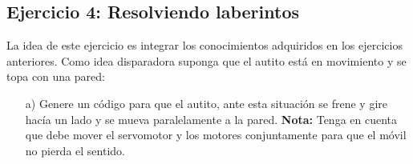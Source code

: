 \documentclass[a4paper,11pt]{article}
\begin{document}
\subsection*{Ejercicio 4: Resolviendo laberintos} La idea de este ejercicio es integrar los conocimientos adquiridos en los ejercicios anteriores. Como idea disparadora suponga que el autito está en movimiento y se topa con una pared:

\begin{itemize}
	\item[a) ] Genere un código para que el autito, ante esta situación se frene y gire hacía un lado y se mueva paralelamente a la pared. 
	\textbf{Nota:} Tenga en cuenta que debe mover el servomotor y los motores conjuntamente para que el móvil no pierda el sentido.
\end{itemize}
\end{document}
